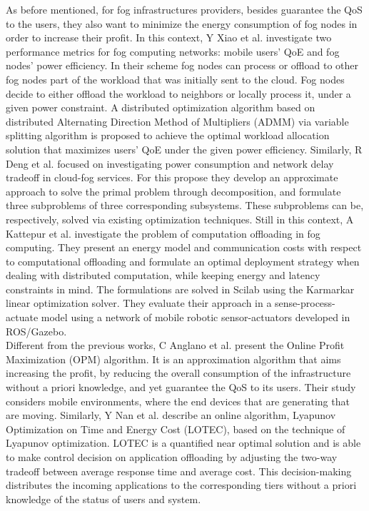 \noindent\tab As before mentioned, for fog infrastructures providers, besides guarantee the QoS to the users, they also want to minimize the energy consumption of fog nodes in order to increase their profit. In this context, Y Xiao et al. \cite{xiao2017qoe} investigate two performance metrics for fog computing networks: mobile users’ QoE and fog nodes’ power efficiency. In their scheme fog nodes can process or offload to other fog nodes part of the workload that was initially sent to the cloud. Fog nodes decide to either offload the workload to neighbors or locally process it, under a given power constraint. A distributed optimization algorithm based on distributed Alternating Direction Method of Multipliers (ADMM) via variable splitting algorithm is proposed to achieve the optimal workload allocation solution that maximizes users’ QoE under the given power efficiency. Similarly, R Deng et al. \cite{deng2016optimal} focused on investigating power consumption and network delay tradeoff in cloud-fog services. For this propose they develop an approximate approach to solve the primal problem through decomposition, and formulate three subproblems of three corresponding subsystems. These subproblems can be, respectively, solved via existing optimization techniques. Still in this context, A Kattepur et al. \cite{kattepur2016resource} investigate the problem of computation offloading in fog computing. They present an energy model and communication costs with respect to computational offloading and formulate an optimal deployment strategy when dealing with distributed computation, while keeping energy and latency constraints in mind. The formulations are solved in Scilab using the Karmarkar linear optimization solver. They evaluate their approach in a sense-process-actuate model using a network of mobile robotic sensor-actuators developed in ROS/Gazebo.\\
\noindent\tab Different from the previous works, C Anglano et al. \cite{anglano2018profit} present the Online Profit Maximization (OPM) algorithm. It is an approximation algorithm that aims increasing the profit, by reducing the overall consumption of the infrastructure without a priori knowledge, and yet guarantee the QoS to its users. Their study considers mobile environments, where the end devices that are generating that are moving. Similarly, Y Nan et al. \cite{nan2017adaptive} describe an online algorithm, Lyapunov Optimization on Time and Energy Cost (LOTEC), based on the technique of Lyapunov optimization. LOTEC is a quantified near optimal solution and is able to make control decision on application offloading by adjusting the two-way tradeoff between average response time and average cost. This decision-making distributes the incoming applications to the corresponding tiers without a priori knowledge of the status of users and system.
